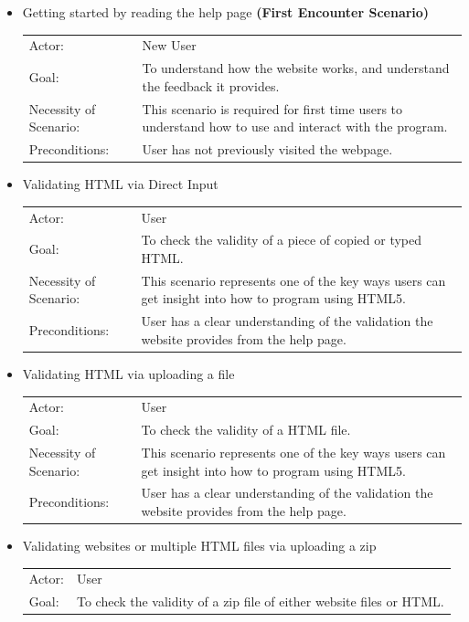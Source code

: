 \documentclass[10pt]{article}
\begin{document}
\begin{itemize}
\item Getting started by reading the help page \textbf{(First Encounter Scenario)} \\
\begin{tabular}{l p{3.5in}}
Actor: & New User \\
Goal: & To understand how the website works, and understand the feedback it provides. \\
Necessity of Scenario: & This scenario is required for first time users to understand how to use and interact with the program. \\
Preconditions: & User has not previously visited the webpage. \\
\end{tabular}
\item Validating HTML via Direct Input \\
\begin{tabular}{l p{3.5in}}
Actor: & User \\
Goal: & To check the validity of a piece of copied or typed HTML. \\
Necessity of Scenario: & This scenario represents one of the key ways users can get insight into how to program using HTML5. \\
Preconditions: & User has a clear understanding of the validation the website provides from the help page. \\
\end{tabular}
\item Validating HTML via uploading a file \\
\begin{tabular}{l p{3.5in}}
Actor: & User \\
Goal: & To check the validity of a HTML file. \\
Necessity of Scenario: & This scenario represents one of the key ways users can get insight into how to program using HTML5. \\
Preconditions: & User has a clear understanding of the validation the website provides from the help page. \\
\end{tabular}
\item Validating websites or multiple HTML files via uploading a zip \\
\begin{tabular}{l p{3.5in}}
Actor: & User \\
Goal: & To check the validity of a zip file of either website files or HTML. \\

\end{tabular}
\end{itemize}
\end{document}

